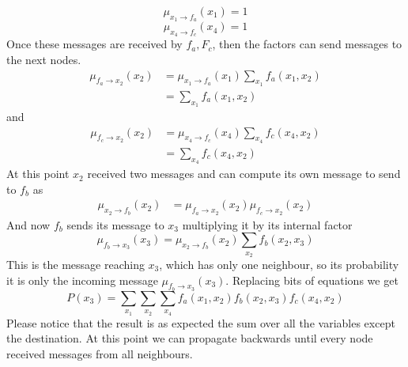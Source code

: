 \[
	\mu_{x_1 \rightarrow f_a}(x_{1}) = 1
\]
\[
	\mu_{x_4 \rightarrow f_c}(x_{4}) = 1
\]
Once these messages are received by $f_{a}, F_{c}$, then the factors can send
messages to the next nodes.
\begin{align*}
	\mu_{f_a \rightarrow x_2}(x_{2}) & = \mu_{x_1 \rightarrow f_a}(x_{1}) \sum_{x_1}f_{a}(x_{1}, x_{2}) \\
	                                 & = \sum_{x_1}f_{a}(x_{1}, x_{2})
\end{align*}
and
\begin{align*}
	\mu_{f_c \rightarrow x_2}(x_{2}) & = \mu_{x_4 \rightarrow f_c}(x_{4}) \sum_{x_4}f_{c}(x_{4}, x_{2}) \\
	                                 & = \sum_{x_4}f_{c}(x_{4}, x_{2})
\end{align*}
At this point $x_{2}$ received two messages and can compute its own message to send
to $f_{b}$ as
\begin{align*}
	\mu_{x_2 \rightarrow f_b}(x_{2}) & = \mu_{f_a \rightarrow x_2}(x_{2}) \mu_{f_c \rightarrow x_2}(x_{2})
\end{align*}
And now $f_{b}$ sends its message to $x_{3}$ multiplying it by its internal factor
\[
	\mu_{f_b \rightarrow x_3}(x_{3}) = \mu_{x_2 \rightarrow f_b}(x_{2}) \sum_{x_2}f
	_{b} (x_{2}, x_{3})
\]
This is the message reaching $x_{3}$, which has only one neighbour, so its probability
it is only the incoming message $\mu_{f_b \rightarrow x_3}(x_{3})$. Replacing
bits of equations we get
\[
	P(x_{3}) = \sum_{x_1}\sum_{x_2}\sum_{x_4}f_{a}(x_{1}, x_{2}) f_{b}(x_{2}, x_{3}
	) f_{c}(x_{4}, x_{2})
\]
Please notice that the result is as expected the sum over all the variables
except the destination. At this point we can propagate backwards until every node
received messages from all neighbours.

